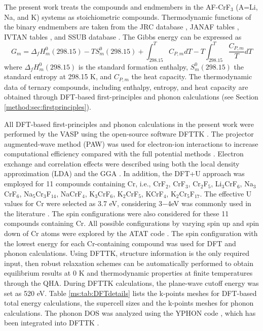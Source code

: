 The present work treats the compounds and endmembers in the AF-CrF${_3}$ (A=Li, Na, and K) systems as stoichiometric compounds. Thermodynamic functions of the binary endmembers are taken from the JRC database \cite{konings2020comprehensive}, JANAF tables \cite{chase1982janaf}, IVTAN tables \cite{gurvich1993ivtanthermo}, and SSUB database \cite{sgteurl}. The Gibbs energy can be expressed as 
\begin{equation} \label{ms:eq:Gstoi}
    G_m=\Delta_f H_m^0 (298.15)-T S_m^0 (298.15)+\int_{298.15}^T C_{P,m} dT - T\int_{298.15}^T \dfrac{C_{P,m}}{T} dT
\end{equation}
where $\Delta_f H_m^0 (298.15)$ is the standard formation enthalpy, $S_m^0 (298.15)$ the standard entropy at 298.15 K, and $C_{P,m}$ the heat capacity. The thermodynamic data of ternary compounds, including enthalpy, entropy, and heat capacity are obtained through DFT-based first-principles and phonon calculations (see Section \ref{method:sec:firstprinciples}).

All DFT-based first-principles and phonon calculations in the present work were performed by the VASP \cite{kresse1996efficient} using the open-source software DFTTK \cite{wang2021dfttk}. The projector augmented-wave method (PAW) was used for electron-ion interactions to increase computational efficiency compared with the full potential methods \cite{blochl1994projector, kresse1999ultrasoft}. Electron exchange and correlation effects were described using both the local density approximation (LDA) \cite{perdew1981self} and the GGA \cite{perdew1996generalized}. In addition, the DFT+U approach was employed for 11 compounds containing Cr, i.e., CrF${_2}$, CrF${_3}$, Cr$_2$F$_5$, Li$_3$CrF$_6$, Na$_3$CrF$_6$, Na$_5$Cr$_3$F$_{14}$, NaCrF$_4$, K$_3$CrF$_6$, K$_2$CrF$_5$, KCrF$_4$, K$_2$Cr$_5$F$_{17}$. The effective U values for Cr were selected as 3.7 eV, considering 3$-$4eV was commonly used in the literature \cite{shi2009magnetism, mattsson2019density, huang2022dft}. The spin configurations were also considered for these 11 compounds containing Cr. All possible configurations by varying spin up and spin down of Cr atoms were explored by the ATAT code \cite{van2009multicomponent}. The spin configuration with the lowest energy for each Cr-containing compound was used for DFT and phonon calculations. Using DFTTK, structure information is the only required input, then robust relaxation schemes can be automatically performed to obtain equilibrium results at 0 K and thermodynamic properties at finite temperatures through the QHA. During DFTTK calculations, the plane-wave cutoff energy was set as 520 eV. Table \ref{ms:tab:DFTdetails} lists the k-points meshes for DFT-based total energy calculations, the supercell sizes and the k-points meshes for phonon calculations. The phonon DOS was analyzed using the YPHON code \cite{wang2014yphon}, which has been integrated into DFTTK \cite{wang2021dfttk}. 

